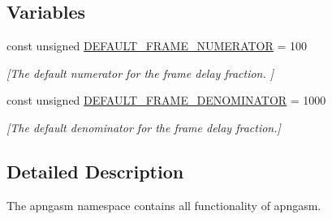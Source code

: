 \subsection*{Variables}
\begin{DoxyCompactItemize}
\item 
\hypertarget{namespaceapngasm_a5b334b6957e14291ff8f76cab562f60f}{const unsigned \hyperlink{namespaceapngasm_a5b334b6957e14291ff8f76cab562f60f}{D\-E\-F\-A\-U\-L\-T\-\_\-\-F\-R\-A\-M\-E\-\_\-\-N\-U\-M\-E\-R\-A\-T\-O\-R} = 100}\label{namespaceapngasm_a5b334b6957e14291ff8f76cab562f60f}

\begin{DoxyCompactList}\small\item\em \mbox{[}The default numerator for the frame delay fraction. \mbox{]} \end{DoxyCompactList}\item 
\hypertarget{namespaceapngasm_a867b3acbcc2624faf6b3e82732110594}{const unsigned \hyperlink{namespaceapngasm_a867b3acbcc2624faf6b3e82732110594}{D\-E\-F\-A\-U\-L\-T\-\_\-\-F\-R\-A\-M\-E\-\_\-\-D\-E\-N\-O\-M\-I\-N\-A\-T\-O\-R} = 1000}\label{namespaceapngasm_a867b3acbcc2624faf6b3e82732110594}

\begin{DoxyCompactList}\small\item\em \mbox{[}The default denominator for the frame delay fraction.\mbox{]} \end{DoxyCompactList}\end{DoxyCompactItemize}


\subsection{Detailed Description}
The apngasm namespace contains all functionality of apngasm. 
